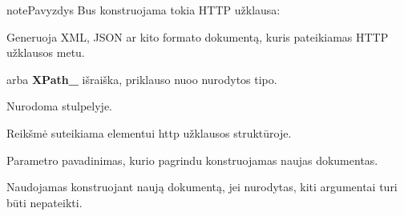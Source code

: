 \documentclass[letterpaper,10pt,lithuanian]{sphinxmanual}
\begin{document}
\begin{fulllineitems}
\begin{sphinxadmonition}{note}{Pavyzdys}
\sphinxAtStartPar
Bus konstruojama tokia HTTP užklausa:

\begin{sphinxVerbatim}[commandchars=\\\{\}]
  
 
 
\end{sphinxVerbatim}
\end{sphinxadmonition}

\end{fulllineitems}


\begin{fulllineitems}
\label{\detokenize{dimensijos:param.prepare.body}}
\pysigstartsignatures
{}
\pysigstopsignatures
\sphinxAtStartPar
Generuoja XML, JSON ar kito formato dokumentą, kuris pateikiamas HTTP
užklausos metu.

\sphinxAtStartPar
{}
\begin{description}
\sphinxAtStartPar
{} arba {\color{red}\bfseries{}XPath\_} išraiška, priklauso nuoo 
nurodytos {\hyperref[\detokenize{dimensijos:resource.prepare.http}]{}}  tipo.

\sphinxAtStartPar
Nurodoma {\hyperref[\detokenize{dimensijos:param.source}]{}} stulpelyje.

\sphinxAtStartPar
Reikšmė suteikiama  elementui http užklausos struktūroje.

\sphinxAtStartPar
Parametro pavadinimas, kurio pagrindu konstruojamas naujas dokumentas.

\sphinxAtStartPar
Naudojamas konstruojant naują dokumentą, jei nurodytas, kiti argumentai
turi būti nepateikti.


\end{description}
\end{fulllineitems}
\end{document}
